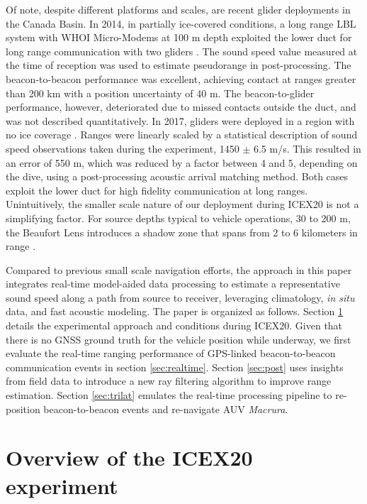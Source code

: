 Of note, despite different platforms and scales, are recent glider deployments in the Canada Basin.
In 2014, in partially ice-covered conditions, a long range LBL system with WHOI Micro-Modems at 100 m depth exploited the lower duct for long range communication with two gliders \citep{Freitag2016,Webster2015}.
The sound speed value measured at the time of reception was used to estimate pseudorange in post-processing.
The beacon-to-beacon performance was excellent, achieving contact at ranges greater than 200 km with a position uncertainty of 40 m.
The beacon-to-glider performance, however, deteriorated due to missed contacts outside the duct, and was not described quantitatively.
In 2017, gliders were deployed in a region with no ice coverage \citep{Graupe2019}.
Ranges were linearly scaled by a statistical description of sound speed observations taken during the experiment, 1450 $\pm$ 6.5 m/s.
This resulted in an error of 550 m, which was reduced by a factor between 4 and 5, depending on the dive, using a post-processing acoustic arrival matching method.
Both cases exploit the lower duct for high fidelity communication at long ranges.
Unintuitively, the smaller scale nature of our deployment during ICEX20 is not a simplifying factor.
For source depths typical to vehicle operations, 30 to 200 m, the Beaufort Lens introduces a shadow zone that spans from 2 to 6 kilometers in range \citep{schmidt_acoustic_2016}.

Compared to previous small scale navigation efforts, the approach in this paper integrates real-time model-aided data processing to estimate a representative sound speed along a path from source to receiver, leveraging climatology, \textit{in situ} data, and fast acoustic modeling.
The paper is organized as follows.
Section \ref{sec:icex20} details the experimental approach and conditions during ICEX20.
Given that there is no GNSS ground truth for the vehicle position while underway, we first evaluate the real-time ranging performance of GPS-linked beacon-to-beacon communication events in section \ref{sec:realtime}.
Section \ref{sec:post} uses insights from field data to introduce a new ray filtering algorithm to improve range estimation.
Section \ref{sec:trilat} emulates the real-time processing pipeline to re-position beacon-to-beacon events and re-navigate AUV \emph{Macrura}.

\clearpage
\section{Overview of the ICEX20 experiment}\label{sec:icex20}

